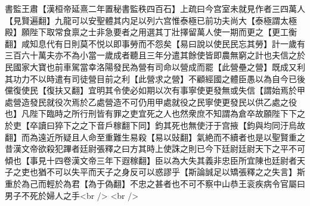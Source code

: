 書監王肅【漢桓帝延熹二年置秘書監秩四百石】上疏曰今宫室未就見作者三四萬人【見賢遍翻】九龍可以安聖體其内足以列六宫惟泰極已前功夫尚大【泰極謂太極殿】願陛下取常食禀之士非急要者之用選其丁壯擇留萬人使一期而更之【更工衡翻】咸知息代有日則莫不悦以即事勞而不怨矣【易曰說以使民民忘其勞】計一歲有三百六十萬夫亦不為小當一歲成者聽且三年分遣其餘使皆即農無窮之計也夫信之於民國家大寶也前車駕當幸洛陽發民為營有司命以營成而罷【此營壘之營】既成又利其功力不以時遣有司徒營目前之利【此營求之營】不顧經國之體臣愚以為自今已後儻復使民【復扶又翻】宜明其令使必如期以次有事寧使更發無或失信【謂始焉於甲處營造發民就役次焉於乙處營造不可仍用甲處就役之民寧使更發民以供乙處之役也】凡陛下臨時之所行刑皆有罪之吏宜死之人也然衆庶不知謂為倉卒故願陛下下之於吏【卒讀曰猝下之之下音戶稼翻下同】鈞其死也無使汙于宫掖【鈞與均同汙烏故翻】而為遠近所疑且人命至重難生易殺【易以䜴翻】氣絶而不續者也是以聖賢重之昔漢文帝欲殺犯蹕者廷尉張釋之曰方其時上使誅之則已今下廷尉廷尉天下之平不可傾也【事見十四卷漢文帝三年下遐稼翻】臣以為大失其義非忠臣所宜陳也廷尉者天子之吏也猶不可以失平而天子之身反可以惑謬乎【斯論誠足以矯張釋之之失言】斯重於為己而輕於為君【為于偽翻】不忠之甚者也不可不察中山恭王衮疾病令官屬曰男子不死於婦人之手<br />
<br />
